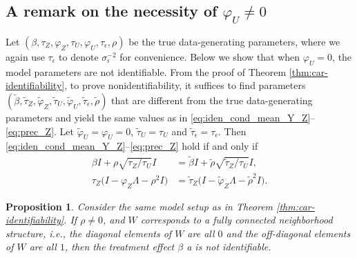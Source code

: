 \documentclass[10pt,a4paper]{amsart}
\newtheorem{proposition}{Proposition}
\begin{document}
\subsection{A remark on the necessity of $\varphi_U\neq 0$}\label{sec:nece_phiU_car}
Let $(\beta, \tau_Z, \varphi_Z, \tau_U, \varphi_U, \tau_{\epsilon}, \rho)$ be the true data-generating parameters, where we again use $\tau_{\epsilon}$ to denote $\sigma_{\epsilon}^{-2}$ for convenience. 
Below we show that when $\varphi_U = 0$, the model parameters are not identifiable. 
From the proof of Theorem \ref{thm:car-identifiability}, 
to prove nonidentifiability, 
it suffices to find parameters 
$(\tilde{\beta}, \tilde{\tau}_Z, \tilde{\varphi}_Z, \tilde{\tau}_U, \tilde{\varphi}_U, \tilde{\tau}_{\epsilon}, \tilde{\rho})$
that are different from the true data-generating parameters and yield the same values as in \eqref{eq:iden_cond_mean_Y_Z}--\eqref{eq:prec_Z}. 
Let $\tilde{\varphi}_U=\varphi_U=0$, $\tilde{\tau}_U = \tau_U$ and $\tilde{\tau}_\epsilon = \tau_\epsilon$. Then \eqref{eq:iden_cond_mean_Y_Z}--\eqref{eq:prec_Z} hold if and only if 
\begin{align*}
    \beta I + \rho \sqrt{\tau_Z/\tau_U} I & = 
    \tilde{\beta} I + \tilde{\rho} \sqrt{\tilde{\tau}_Z/\tau_U} I, 
    \\ 
    \tau_Z \big( I - \varphi_Z \Lambda - \rho^2 I \big)
    & = 
    \tilde{\tau}_Z \big( I - \tilde{\varphi}_Z \Lambda - \tilde{\rho}^2 I \big).
\end{align*}

\begin{proposition}\label{prop:car-fullyconnected-nonid}
Consider the same model setup as in Theorem \ref{thm:car-identifiability}. 
If 
$\rho \ne 0$, and
$W$ corresponds to a fully connected neighborhood structure, i.e., the diagonal elements of $W$ are all $0$ and the off-diagonal elements of $W$ are all $1$, 
then the treatment effect $\beta$ a
is 
not identifiable.
\end{proposition}
\end{document}
